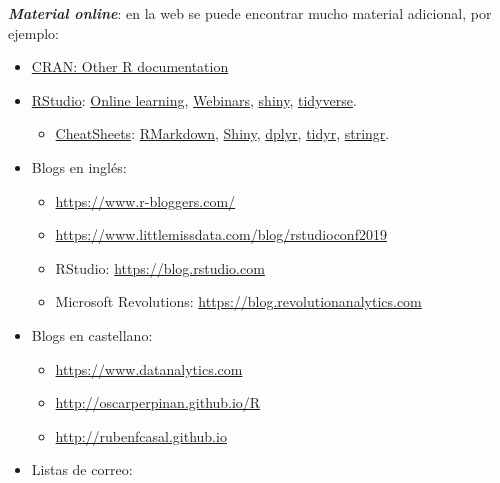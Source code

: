 \documentclass[]{book}
\providecommand{\tightlist}{%
  \setlength{\itemsep}{0pt}\setlength{\parskip}{0pt}}
\theoremstyle{break}
\theoremstyle{definition}
\theoremstyle{definition}
\theoremstyle{definition}
\theoremstyle{remark}
\begin{document}
\textbf{\emph{Material online}}: en la web se puede encontrar mucho
material adicional, por ejemplo:

\begin{itemize}
\item
  \href{https://www.r-project.org/other-docs.html}{CRAN: Other R
  documentation}
\item
  \href{https://www.rstudio.com}{RStudio}:
  \href{https://www.rstudio.com/online-learning}{Online learning},
  \href{https://resources.rstudio.com/webinars}{Webinars},
  \href{http://shiny.rstudio.com}{shiny},
  \href{https://www.tidyverse.org/}{tidyverse}.

  \begin{itemize}
  \tightlist
  \item
    \href{https://resources.rstudio.com/rstudio-cheatsheets}{CheatSheets}:
    \href{https://resources.rstudio.com/rstudio-cheatsheets/rmarkdown-2-0-cheat-sheet}{RMarkdown},
    \href{https://resources.rstudio.com/rstudio-cheatsheets/shiny-cheat-sheet}{Shiny},
    \href{https://github.com/rstudio/cheatsheets/blob/master/data-transformation.pdf}{dplyr},
    \href{https://github.com/rstudio/cheatsheets/blob/master/data-import.pdf}{tidyr},
    \href{https://resources.rstudio.com/rstudio-cheatsheets/stringr-cheat-sheet}{stringr}.
  \end{itemize}
\item
  Blogs en inglés:

  \begin{itemize}
  \item
    \url{https://www.r-bloggers.com/}
  \item
    \url{https://www.littlemissdata.com/blog/rstudioconf2019}
  \item
    RStudio: \url{https://blog.rstudio.com}
  \item
    Microsoft Revolutions: \url{https://blog.revolutionanalytics.com}
  \end{itemize}
\item
  Blogs en castellano:

  \begin{itemize}
  \item
    \url{https://www.datanalytics.com}
  \item
    \url{http://oscarperpinan.github.io/R}
  \item
    \url{http://rubenfcasal.github.io}
  \end{itemize}
\item
  Listas de correo:


\end{itemize}
\end{document}
